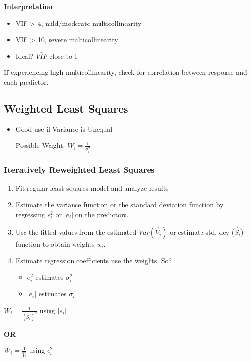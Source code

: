 \documentclass[11pt]{article}
\begin{document}
\textbf{Interpretation}
\begin{itemize}
\item VIF > 4, mild/moderate multicollinearity
\item VIF > 10, severe multicollinearity
\item Ideal? \(\bar{VIF}\) close to 1
\end{itemize}

If experiencing high multicollinearity, check for correlation between response
and each predictor.

\subsection{Weighted Least Squares}
\label{sec:org0e19f57}
\begin{itemize}
\item Good use if Variance is Unequal

Possible Weight: \(W_i = \frac{1}{\sigma_i^2}\)
\end{itemize}

\subsubsection{Iteratively Reweighted Least Squares}
\label{sec:org5b26153}
\begin{enumerate}
\item Fit regular least squares model and analyze results
\item Estimate the variance function or the standard deviation function by
regressing \(e_i^2\) or \(|e_i|\) on the predictors.
\item Use the fitted values from the estimated \(Var(\hat{V_i})\) or estimate std.
dev (\(\hat{S_i}\)) function to obtain weights \(w_i\).
\item Estimate regression coefficients use the weights. So?
\begin{itemize}
\item \(e_i^2\) estimates \(\sigma_i^2\)
\item \(|e_i|\) estimates \(\sigma_i\)
\end{itemize}
\end{enumerate}

\(W_i = \frac{1}{(\hat{S_i})^2}\) using \(|e_i|\)

\textbf{OR}

\(W_i = \frac{1}{\hat{V_i}}\) using \(e_i^2\)
\end{document}
